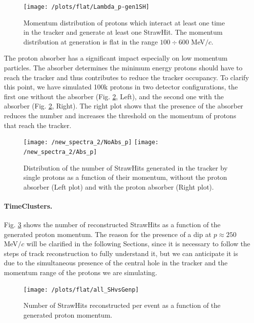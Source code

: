 \documentclass[12pt,a4paper,openright, oneside, titlepage]{book} %
\begin{document}
\begin{figure}[h!]
\centering
\texttt{[image: /plots/flat/Lambda\_p-gen1SH]}
\caption[Momentum distribution for particles interacting in the tracker]{Momentum distribution of protons which interact 
at least one time in the tracker and generate at least one StrawHit. 
The momentum distribution at generation is flat in the range $100 \div 600$ MeV$/c$.}
\label{_flat_Lambda_p-gen1SH}
\end{figure}

\noindent 
The proton absorber has a significant impact especially on low momentum particles. 
The absorber determines the minimum energy protons should have to reach the tracker
and thus contributes to reduce the tracker occupancy.
To clarify this point, 
we have simulated 100k protons in two detector configurations, 
the first one without the absorber  (Fig. \ref{_proton_absorber}, Left), 
and the second one with the absorber (Fig. \ref{_proton_absorber}, Right). 
The right plot shows that the presence of the absorber reduces the number 
and increases the threshold on the momentum of protons
that reach the tracker.


\begin{figure}[h!]
\centering
\texttt{[image: /new\_spectra\_2/NoAbs\_p]}\hfill
\texttt{[image: /new\_spectra\_2/Abs\_p]}
\caption[StrawHits with and without proton absorber]
{Distribution of the number of StrawHits generated in the tracker by single protons
as a function of their momentum, without the proton absorber (Left plot)
and with the proton absorber (Right plot).}
\label{_proton_absorber}
\end{figure}

\paragraph{TimeClusters.} 
Fig. \ref{_all_SHvsGenp} shows the number of reconstructed StrawHits as a function 
of the generated proton momentum.
The reason for the presence of a dip at $p\approx 250$ MeV$/c$ will be clarified in the following Sections, 
since it is necessary to follow the steps of track reconstruction to fully understand it, 
but we can anticipate it is due to the simultaneous presence of the central hole in the tracker 
and the momentum range of the protons we are simulating.

\begin{figure}[h!]
\centering
\texttt{[image: /plots/flat/all\_SHvsGenp]}
\caption[Number of StrawHits per event]{Number of StrawHits reconstructed per event as a function of the generated proton momentum.}
\label{_all_SHvsGenp}
\end{figure}
\end{document}
